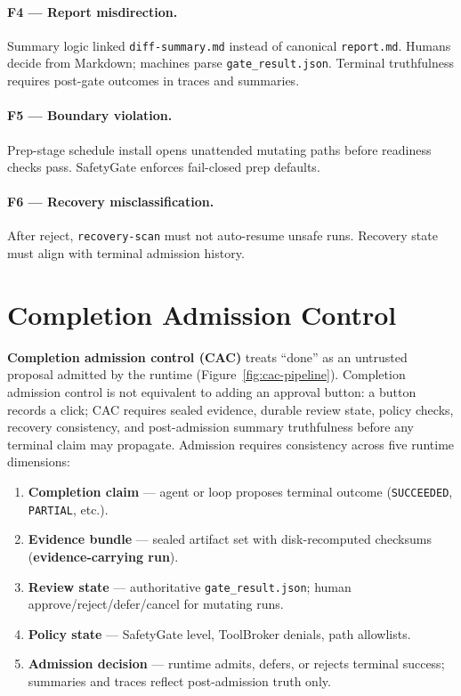 \documentclass[11pt]{article}
\newcommand{\cac}{\textsc{CAC}}
\begin{document}
\paragraph{F4 --- Report misdirection.}
Summary logic linked \texttt{diff-summary.md} instead of canonical \texttt{report.md}.
Humans decide from Markdown; machines parse \texttt{gate\_result.json}.
Terminal truthfulness requires post-gate outcomes in traces and summaries.

\paragraph{F5 --- Boundary violation.}
Prep-stage schedule install opens unattended mutating paths before readiness checks pass.
SafetyGate enforces fail-closed prep defaults.

\paragraph{F6 --- Recovery misclassification.}
After reject, \texttt{recovery-scan} must not auto-resume unsafe runs.
Recovery state must align with terminal admission history.

\section{Completion Admission Control}
\label{sec:cac}

\textbf{Completion admission control (\cac{})} treats ``done'' as an untrusted proposal admitted by the runtime (Figure~\ref{fig:cac-pipeline}).
Completion admission control is not equivalent to adding an approval button: a button records a click; \cac{} requires sealed evidence, durable review state, policy checks, recovery consistency, and post-admission summary truthfulness before any terminal claim may propagate.
Admission requires consistency across five runtime dimensions:

\begin{enumerate}[leftmargin=*]
  \item \textbf{Completion claim} --- agent or loop proposes terminal outcome (\texttt{SUCCEEDED}, \texttt{PARTIAL}, etc.).
  \item \textbf{Evidence bundle} --- sealed artifact set with disk-recomputed checksums (\textbf{evidence-carrying run}).
  \item \textbf{Review state} --- authoritative \texttt{gate\_result.json}; human approve/reject/defer/cancel for mutating runs.
  \item \textbf{Policy state} --- SafetyGate level, ToolBroker denials, path allowlists.
  \item \textbf{Admission decision} --- runtime admits, defers, or rejects terminal success; summaries and traces reflect post-admission truth only.
\end{enumerate}
\end{document}
